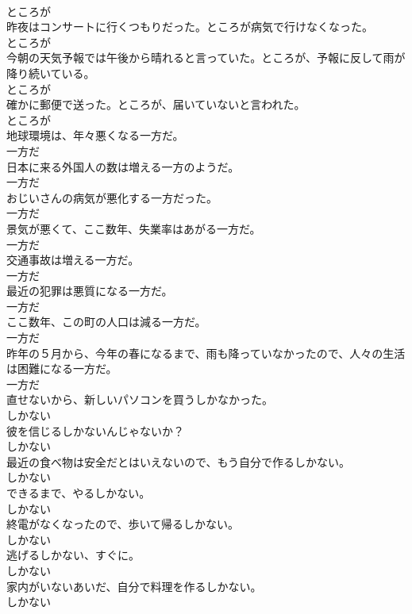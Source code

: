 \documentclass[8pt]{extreport}
\begin{document}
\begin{CJK}{UTF8}{min}
\\	ところが	
\\	昨夜はコンサートに行くつもりだった。ところが病気で行けなくなった。	
\\	ところが	
\\	今朝の天気予報では午後から晴れると言っていた。ところが、予報に反して雨が降り続いている。	
\\	ところが	
\\	確かに郵便で送った。ところが、届いていないと言われた。	
\\	ところが	
\\	地球環境は、年々悪くなる一方だ。	
\\	一方だ	
\\	日本に来る外国人の数は増える一方のようだ。	
\\	一方だ	
\\	おじいさんの病気が悪化する一方だった。	
\\	一方だ	
\\	景気が悪くて、ここ数年、失業率はあがる一方だ。	
\\	一方だ	
\\	交通事故は増える一方だ。	
\\	一方だ	
\\	最近の犯罪は悪質になる一方だ。	
\\	一方だ	
\\	ここ数年、この町の人口は減る一方だ。	
\\	一方だ	
\\	昨年の５月から、今年の春になるまで、雨も降っていなかったので、人々の生活は困難になる一方だ。	
\\	一方だ	
\\	直せないから、新しいパソコンを買うしかなかった。	
\\	しかない	
\\	彼を信じるしかないんじゃないか？	
\\	しかない	
\\	最近の食べ物は安全だとはいえないので、もう自分で作るしかない。	
\\	しかない	
\\	できるまで、やるしかない。	
\\	しかない	
\\	終電がなくなったので、歩いて帰るしかない。	
\\	しかない	
\\	逃げるしかない、すぐに。	
\\	しかない	
\\	家内がいないあいだ、自分で料理を作るしかない。	
\\	しかない	

\end{CJK}
\end{document}
